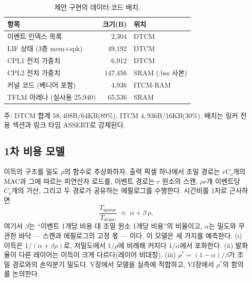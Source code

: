 \begin{table}[htbp]
\centering
\caption{제안 구현의 데이터$\cdot$코드 배치.}
\label{tab:placement}
\footnotesize
\setlength{\tabcolsep}{4pt}
\begin{tabular}{l r l}
\hline
항목 & 크기(B) & 위치 \\
\hline
이벤트 인덱스 목록 & 2,304 & DTCM \\
LIF 상태 (3층 mem$+$spk) & 49,192 & DTCM \\
CPL1 전치 가중치 & 6,912 & DTCM \\
CPL2 전치 가중치 & 147,456 & SRAM (.bss 사본) \\
커널 코드 (베니어 포함) & 4,936 & ITCM-RAM \\
TFLM 아레나 (실사용 25,940) & 65,536 & SRAM \\
\hline
\end{tabular}
\begin{flushleft}
\footnotesize 주: DTCM 합계 $58{,}408$B/64KB(89\%), ITCM
$4{,}936$B/16KB(30\%). 배치는 링커 전용 섹션과 링크 타임 ASSERT로
강제된다.
\end{flushleft}
\end{table}

\subsection{1차 비용 모델}\label{sec:costmodel}

이득의 구조를 밀도 $\rho$의 함수로 추상화하자. 출력 픽셀 하나에서
조밀 경로는 $r C_o$개의 MAC과 그에 따르는 피연산자 로드를,
이벤트 경로는 $r$ 원소의 스캔, $\rho r$개 이벤트당 $C_o$개의
가산, 그리고 두 경로가 공유하는 에필로그를 수행한다. 시간비를
1차로 근사하면
\begin{equation}
\frac{T_{\mathrm{sparse}}}{T_{\mathrm{dense}}}
\;\approx\; \alpha + \beta\,\rho,
\label{eq:costmodel}
\end{equation}
여기서 $\beta$는 ``이벤트 1개당 비용 대 조밀 원소 1개당 비용''의
비율이고, $\alpha$는 밀도와 무관한 바닥 --- 스캔과 에필로그의 고정
몫 --- 이다. 이 모델은 세 가지를 예측한다. (i) 이득은
$1/(\alpha+\beta\rho)$로, 저밀도에서 $1/\rho$에 비례해 커지다
$1/\alpha$에서 포화한다. (ii) 발화율이 다른 레이어는 이득이 크게
다르다(레이어 비대칭). (iii) $\rho^{*}=(1-\alpha)/\beta$가 조밀
경로와의 손익분기 밀도다. V장에서 모델을 실측에 적합하고, VI장에서
$\rho^{*}$의 함의를 논의한다.
